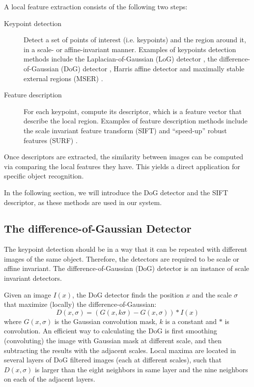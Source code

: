 \documentclass[12pt,final,twoside]{report}
\theoremstyle{plain}
\theoremstyle{definition}
\theoremstyle{remark}
\begin{document}
A local feature extraction consists of the following two steps: 
\begin{description}
  \item[Keypoint detection] Detect a set of points of interest (i.e. keypoints) and the region around it, in a scale- or affine-invariant manner. Examples of keypoints detection methods include the Laplacian-of-Gaussian (LoG) detector \cite{lindeberg_feature_1998}, the difference-of-Gaussian (DoG) detector \cite{lowe_object_1999}, Harris affine detector \cite{mikolajczyk_scale_2004} and maximally stable external regions (MSER) \cite{matas_robust_2004}. 
  \item[Feature description] For each keypoint, compute its descriptor, which is a feature vector that describe the local region. Examples of feature description methods include the scale invariant feature transform (SIFT) and ``speed-up'' robust features (SURF) \cite{bay_speeded-up_2008}.
\end{description}

Once descriptors are extracted, the similarity between images can be computed via comparing the local features they have. This yields a direct application for specific object recognition.

In the following section, we will introduce the DoG detector and the SIFT descriptor, as these methods are used in our system.

\subsection{The difference-of-Gaussian Detector}
The keypoint detection should be in a way that it can be repeated with different images of the same object. Therefore, the detectors are required to be scale or affine invariant. The difference-of-Gaussian (DoG) detector is an instance of scale invariant detectors.

Given an image $I(x)$, the DoG detector finds the position $x$ and the scale $\sigma$ that maximize (locally) the difference-of-Gaussian:
\begin{equation}
  D(x,\sigma) = (G(x,k\sigma) - G(x,\sigma)) * I(x)
\end{equation}
where $G(x,\sigma)$ is the Gaussian convolution mask, $k$ is a constant and $*$ is convolution. An efficient way to calculating the DoG is first smoothing (convoluting) the image with Gaussian mask at different scale, and then subtracting the results with the adjacent scales. Local maxima are located in several layers of DoG filtered images (each at different scales), such that $D(x,\sigma)$ is larger than the eight neighbors in same layer and the nine neighbors on each of the adjacent layers.
\end{document}
